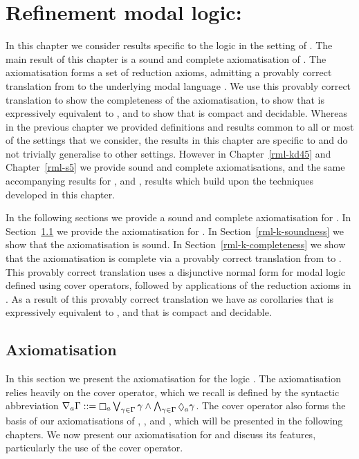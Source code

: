 \chapter{Refinement modal logic: \classK{}}\label{rml-k}

In this chapter we consider results specific to the logic \logicRmlK{} in the setting of \classK{}.
The main result of this chapter is a sound and complete axiomatisation of \logicRmlK{}.
The axiomatisation forms a set of reduction axioms, admitting a provably correct translation from \langRml{} to the underlying modal language \langMl{}.
We use this provably correct translation to show the completeness of the axiomatisation, to show that \logicRmlK{} is expressively equivalent to \logicK{}, and to show that \logicRmlK{} is compact and decidable.
Whereas in the previous chapter we provided definitions and results common to all or most of the settings that we consider, the results in this chapter are specific to \logicRmlK{} and do not trivially generalise to other settings.
However in Chapter~\ref{rml-kd45} and Chapter~\ref{rml-s5} we provide sound and complete axiomatisations, and the same accompanying results for \logicRmlKFF{}, \logicRmlKD{} and \logicRmlS{}, results which build upon the techniques developed in this chapter.

In the following sections we provide a sound and complete axiomatisation for \logicRmlK{}.
In Section~\ref{rml-k-axiomatisation} we provide the axiomatisation for \logicRmlK{}.
In Section~\ref{rml-k-soundness} we show that the axiomatisation is sound.
In Section~\ref{rml-k-completeness} we show that the axiomatisation is complete via a provably correct translation from \langRml{} to \langMl{}.
This provably correct translation uses a disjunctive normal form for modal logic defined using cover operators, followed by applications of the reduction axioms in \axiomRmlK{}.
As a result of this provably correct translation we have as corollaries that \logicRmlK{} is expressively equivalent to \logicK{}, and that \logicRml{} is compact and decidable.

\section{Axiomatisation}\label{rml-k-axiomatisation}

In this section we present the axiomatisation \axiomRmlK{} for the logic \logicRmlK{}.
The axiomatisation relies heavily on the cover operator, which we recall is defined by the syntactic abbreviation $\coversA \Gamma ::= \necessaryA \bigvee_{\gamma \in \Gamma} \gamma \land \bigwedge_{\gamma \in \Gamma} \possibleA \gamma$.
The cover operator also forms the basis of our axiomatisations of \logicRmlKFF{}, \logicRmlKD{}, and \logicRmlS{}, which will be presented in the following chapters.
We now present our axiomatisation for \logicRmlK{} and discuss its features, particularly the use of the cover operator.

